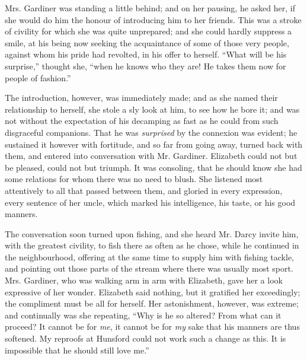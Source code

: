 Mrs. Gardiner was standing a little behind; and on
her pausing, he asked her, if she would do him the honour
of introducing him to her friends. This was a stroke of
civility for which she was quite unprepared; and she
could hardly suppress a smile, at his being now seeking
the acquaintance of some of those very people, against
whom his pride had revolted, in his offer to herself. “What
will be his surprise,” thought she, “when he knows who
they are! He takes them now for people of fashion.”

The introduction, however, was immediately made;
and as she named their relationship to herself, she stole
a sly look at him, to see how he bore it; and was not
without the expectation of his decamping as fast as he
could from such disgraceful companions. That he was
\textit{surprised} by the connexion was evident; he sustained it
however with fortitude, and so far from going away,
turned back with them, and entered into conversation
with Mr. Gardiner. Elizabeth could not but be pleased,
could not but triumph. It was consoling, that he should
know she had some relations for whom there was no need
to blush. She listened most attentively to all that passed
between them, and gloried in every expression, every
sentence of her uncle, which marked his intelligence, his
taste, or his good manners.

The conversation soon turned upon fishing, and she
heard Mr. Darcy invite him, with the greatest civility, to
fish there as often as he chose, while he continued in the
neighbourhood, offering at the same time to supply him
with fishing tackle, and pointing out those parts of the
stream where there was usually most sport. Mrs. Gardiner,
who was walking arm in arm with Elizabeth, gave her
a look expressive of her wonder. Elizabeth said nothing,
but it gratified her exceedingly; the compliment must
be all for herself. Her astonishment, however, was
extreme; and continually was she repeating, “Why is
he so altered? From what can it proceed? It cannot
be for \textit{me}, it cannot be for \textit{my} sake that his manners are
thus softened. My reproofs at Hunsford could not work
such a change as this. It is impossible that he should
still love me.”

